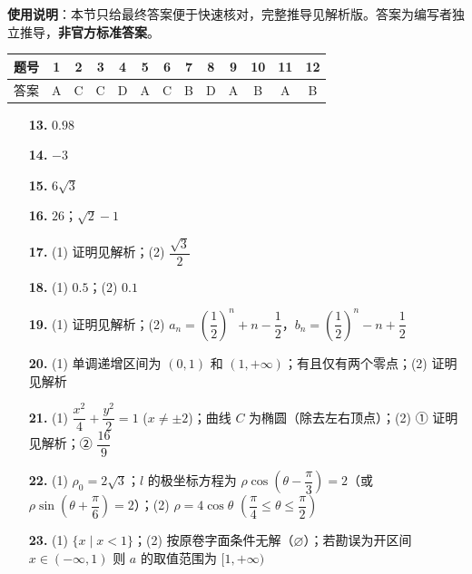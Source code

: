 
\begin{gknotice}
\textbf{使用说明}：本节只给最终答案便于快速核对，完整推导见解析版。答案为编写者独立推导，\textbf{非官方标准答案}。
\end{gknotice}

\begin{center}\begin{tabular}{ccccccccccccc}
\toprule
题号 & 1 & 2 & 3 & 4 & 5 & 6 & 7 & 8 & 9 & 10 & 11 & 12 \\
\midrule
答案 & A & C & C & D & A & C & B & D & A & B & A & B \\
\bottomrule
\end{tabular}\end{center}

\begin{itemize}[leftmargin=2.6em]
  \item[\textbf{13.}] $0.98$
  \item[\textbf{14.}] $-3$
  \item[\textbf{15.}] $6\sqrt{3}$
  \item[\textbf{16.}] $26$；$\sqrt{2}-1$
\end{itemize}

\begin{itemize}[leftmargin=2.6em]
  \item[\textbf{17.}] (1) 证明见解析；(2) $\dfrac{\sqrt{3}}{2}$
  \item[\textbf{18.}] (1) $0.5$；(2) $0.1$
  \item[\textbf{19.}] (1) 证明见解析；(2) $a_n = \left(\dfrac{1}{2}\right)^n + n - \dfrac{1}{2}$，$b_n = \left(\dfrac{1}{2}\right)^n - n + \dfrac{1}{2}$
  \item[\textbf{20.}] (1) 单调递增区间为 $(0, 1)$ 和 $(1, +\infty)$；有且仅有两个零点；(2) 证明见解析
  \item[\textbf{21.}] (1) $\dfrac{x^2}{4} + \dfrac{y^2}{2} = 1$ ($x \neq \pm 2$)；曲线 $C$ 为椭圆（除去左右顶点）；(2) ① 证明见解析；② $\dfrac{16}{9}$
\end{itemize}

\begin{itemize}[leftmargin=2.6em]
  \item[\textbf{22.}] (1) $\rho_0 = 2\sqrt{3}$；$l$ 的极坐标方程为 $\rho\cos\left(\theta - \dfrac{\pi}{3}\right) = 2$（或 $\rho\sin\left(\theta + \dfrac{\pi}{6}\right) = 2$）；(2) $\rho = 4\cos\theta$ $\left(\dfrac{\pi}{4} \leqslant \theta \leqslant \dfrac{\pi}{2}\right)$
  \item[\textbf{23.}] (1) $\{x \mid x < 1\}$；(2) 按原卷字面条件无解（$\varnothing$）；若勘误为开区间 $x \in (-\infty, 1)$ 则 $a$ 的取值范围为 $[1, +\infty)$
\end{itemize}
